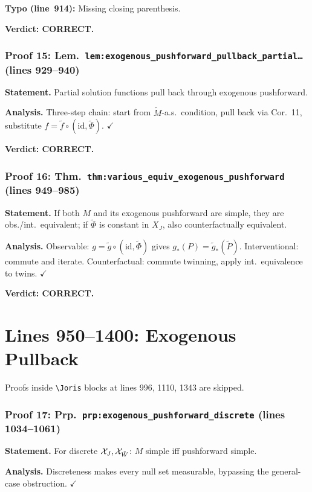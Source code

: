\documentclass{article}
\begin{document}
\textbf{Typo (line~914):} Missing closing parenthesis.

\textbf{Verdict: CORRECT.}

\section{Proof 15: Lem.\ \texttt{lem:exogenous\_pushforward\_pullback\_partial\ldots}
(lines 929--940)}
\textbf{Statement.} Partial solution functions pull back through exogenous
pushforward.

\textbf{Analysis.} Three-step chain: start from $\tilde M$-a.s.\ condition,
pull back via Cor.~11, substitute $f=\tilde f\circ(\mathrm{id},\tilde\Phi)$.
$\checkmark$

\textbf{Verdict: CORRECT.}

\section{Proof 16: Thm.\ \texttt{thm:various\_equiv\_exogenous\_pushforward}
(lines 949--985)}
\textbf{Statement.} If both $M$ and its exogenous pushforward are simple, they
are obs./int.\ equivalent; if $\tilde\Phi$ is constant in $X_J$, also
counterfactually equivalent.

\textbf{Analysis.} Observable: $g=\tilde g\circ(\mathrm{id},\tilde\Phi)$
gives $g_*(P)=\tilde g_*(\tilde P)$.
Interventional: commute and iterate.
Counterfactual: commute twinning, apply int.\ equivalence to twins.
$\checkmark$

\textbf{Verdict: CORRECT.}

\part*{Lines 950--1400: Exogenous Pullback}

Proofs inside \verb|\Joris| blocks at lines 996, 1110, 1343 are skipped.

\section{Proof 17: Prp.\ \texttt{prp:exogenous\_pushforward\_discrete}
(lines 1034--1061)}
\textbf{Statement.} For discrete $\mathcal{X}_J,\mathcal{X}_{\tilde W}$: $M$ simple iff
pushforward simple.

\textbf{Analysis.} Discreteness makes every null set measurable, bypassing
the general-case obstruction.  $\checkmark$
\end{document}
